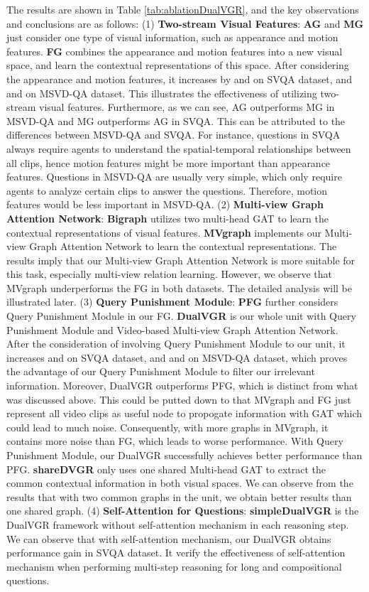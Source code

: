 \documentclass[journal]{IEEEtran}
\begin{document}
The results are shown in Table \ref{tab:ablationDualVGR}, and the key observations and conclusions are as follows: (1) \textbf{Two-stream Visual Features}: \textbf{AG} and \textbf{MG} just consider one type of visual information, such as appearance and motion features. \textbf{FG} combines the appearance and motion features into a new visual space, and learn the contextual representations of this space. After considering the appearance and motion features, it increases by  and  on SVQA dataset, and  and  on MSVD-QA dataset. This illustrates the effectiveness of utilizing two-stream visual features. Furthermore, as we can see, AG outperforms MG in MSVD-QA and MG outperforms AG in SVQA. This can be attributed to the differences between MSVD-QA and SVQA. For instance, questions in SVQA always require agents to understand the spatial-temporal relationships between all clips, hence motion features might be more important than appearance features. Questions in MSVD-QA are usually very simple, which only require agents to analyze certain clips to answer the questions. Therefore, motion features would be less important in MSVD-QA. (2) \textbf{Multi-view Graph Attention Network}: \textbf{Bigraph} utilizes two multi-head GAT to learn the contextual representations of visual features. \textbf{MVgraph} implements our Multi-view Graph Attention Network to learn the contextual representations. The results imply that our Multi-view Graph Attention Network is more suitable for this task, especially multi-view relation learning. However, we observe that MVgraph underperforms the FG in both datasets. The detailed analysis will be illustrated later. (3) \textbf{Query Punishment Module}: \textbf{PFG} further considers Query Punishment Module in our FG. \textbf{DualVGR} is our whole unit with Query Punishment Module and Video-based Multi-view Graph Attention Network. After the consideration of involving Query Punishment Module to our unit, it increases  and  on SVQA dataset, and  and  on MSVD-QA dataset, which proves the advantage of our Query Punishment Module to filter our irrelevant information. Moreover, DualVGR outperforms PFG, which is distinct from what was discussed above. This could be putted down to that MVgraph and FG just represent all video clips as useful node to propogate information with GAT which could lead to much noise. Consequently, with more graphs in MVgraph, it contains more noise than FG, which leads to worse performance. With Query Punishment Module, our DualVGR successfully achieves better performance than PFG. \textbf{shareDVGR} only uses one shared Multi-head GAT to extract the common contextual information in both visual spaces. We can observe from the results that with two common graphs in the unit, we obtain better results than one shared graph. (4) \textbf{Self-Attention for Questions}: \textbf{simpleDualVGR} is the DualVGR framework without self-attention mechanism in each reasoning step. We can observe that with self-attention mechanism, our DualVGR obtains  performance gain in SVQA dataset. It verify the effectiveness of self-attention mechanism when performing multi-step reasoning for long and compositional questions.
\end{document}
